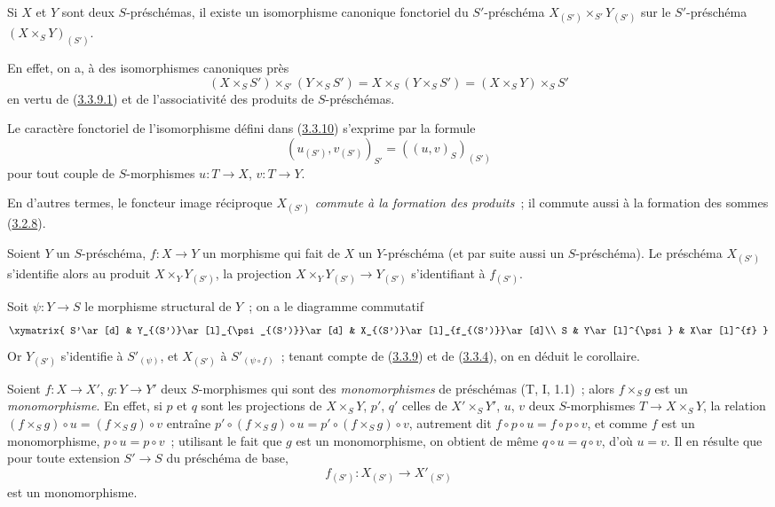 \begin{corollary}[3.3.10]
\label{I.3.3.10-fr}
Si $X$ et $Y$ sont deux $S$-préschémas, il existe un isomorphisme canonique
fonctoriel du $S'$-préschéma $X_{(S')}\times_{S'}Y_{(S')}$ sur le
$S'$-préschéma $(X\times_S Y)_{(S')}$.
\end{corollary}

En effet, on a, à des isomorphismes canoniques près
\[
  (X\times_S S')\times_{S'}(Y\times_S S')
  =X\times_S(Y\times_S S')=(X\times_S Y)\times_S S'
\]
en vertu de (\hyperref[I.3.3.9.1-fr]{3.3.9.1}) et de l'associativité des
produits de $S$-préschémas.

Le caractère fonctoriel de l'isomorphisme défini dans
(\hyperref[I.3.3.10-fr]{3.3.10}) s'exprime par la formule
\begin{equation}
  (u_{(S')},v_{(S')})_{S'}=((u,v)_S)_{(S')}
  \tag{3.3.10.1}\label{I.3.3.10.1-fr}
\end{equation}
pour tout couple de $S$-morphismes $u:T\to X$, $v:T\to Y$.

En d'autres termes, le foncteur image réciproque $X_{(S')}$
\emph{commute à la formation des produits}~; il commute aussi à la formation
des sommes (\hyperref[I.3.2.8-fr]{3.2.8}).

\begin{corollary}[3.3.11]
\label{I.3.3.11-fr}
Soient $Y$ un $S$-préschéma, $f:X\to Y$ un morphisme qui fait de $X$ un
$Y$-préschéma (et par suite aussi un $S$-préschéma). Le préschéma $X_{(S')}$
s'identifie alors au produit $X\times_Y Y_{(S')}$, la projection
$X\times_Y Y_{(S')}\to Y_{(S')}$ s'identifiant à $f_{(S')}$.
\end{corollary}

Soit $\psi:Y\to S$ le morphisme structural de $Y$~; on a le diagramme
commutatif
\label{I.3.3.11.diagram-fr}
\[
  \xymatrix{
    S'\ar[d] &
    Y_{(S')}\ar[l]_{\psi_{(S')}}\ar[d] &
    X_{(S')}\ar[l]_{f_{(S')}}\ar[d]\\
    S & Y\ar[l]^{\psi} & X\ar[l]^{f}
  }
\]
Or $Y_{(S')}$ s'identifie à $S'_{(\psi)}$, et $X_{(S')}$ à
$S'_{(\psi\circ f)}$~; tenant compte de (\hyperref[I.3.3.9-fr]{3.3.9}) et de
(\hyperref[I.3.3.4-fr]{3.3.4}), on en déduit le corollaire.

\begin{env}[3.3.12]
\label{I.3.3.12-fr}
Soient $f:X\to X'$, $g:Y\to Y'$ deux $S$-morphismes qui sont des
\emph{monomorphismes} de préschémas (T, I, 1.1)~; alors $f\times_S g$ est un
\emph{monomorphisme}. En effet, si $p$ et $q$ sont les projections de
$X\times_S Y$, $p'$, $q'$ celles de $X'\times_S Y'$, $u$, $v$ deux
$S$-morphismes $T\to X\times_S Y$, la relation
$(f\times_S g)\circ u=(f\times_S g)\circ v$ entraîne
$p'\circ(f\times_S g)\circ u=p'\circ(f\times_S g)\circ v$, autrement dit
$f\circ p\circ u=f\circ p\circ v$, et comme $f$ est un monomorphisme,
$p\circ u=p\circ v$~; utilisant le fait que $g$ est un monomorphisme, on
obtient de même $q\circ u=q\circ v$, d'où $u=v$.
Il en résulte que pour toute extension $S'\to S$ du préschéma de base,
\label{I.3.3.12.base-change-monomorphism-fr}
\[
  f_{(S')}:X_{(S')}\to X'_{(S')}
\]
est un monomorphisme.
\end{env}

